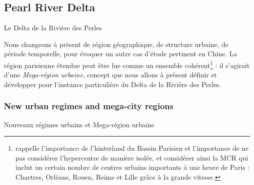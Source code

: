 \subsection{Pearl River Delta}{Le Delta de la Rivière des Perles}

Nous changeons à présent de région géographique, de structure urbaine, de période temporelle, pour évoquer un autre cas d'étude pertinent en Chine. La région parisienne étendue peut être lue comme un ensemble cohérent\footnote{\cite{gilli2005bassin} rappelle l'importance de l'hinterland du Bassin Parisien et l'importance de ne pas considérer l'hypercentre de manière isolée, et considérer ainsi la MCR qui inclut un certain nombre de centres urbains importants à une heure de Paris : Chartres, Orléans, Rouen, Reims et Lille grâce à la grande vitesse.} : il s'agirait d'une \emph{Mega-région urbaine}, concept que nous allons à présent définir et développer pour l'instance particulière du Delta de la Rivière des Perles.




\subsubsection{New urban regimes and mega-city regions}{Nouveaux régimes urbains et Mega-région urbaine}




